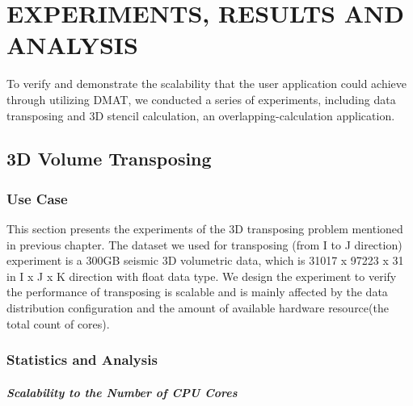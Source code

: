 %
%
%


\chapter{\uppercase{Experiments, Results and Analysis}}

To verify and demonstrate the scalability that the user application could achieve through utilizing DMAT, we conducted a series of experiments, including data transposing and 3D stencil calculation, an overlapping-calculation application. 

\section{3D Volume Transposing}

\subsection{Use Case}

This section presents the experiments of the 3D transposing problem mentioned in previous chapter. The dataset we used for transposing (from I  to J direction) experiment is a 300GB seismic 3D volumetric data, which is 31017 x 97223 x 31 in I x J x K direction with float data type. 
We design the experiment to verify the performance of transposing is scalable and is mainly affected by the data distribution configuration and the amount of available hardware resource(the total count of cores).

\subsection{Statistics and Analysis}

\paragraph{Scalability to the Number of CPU Cores}

